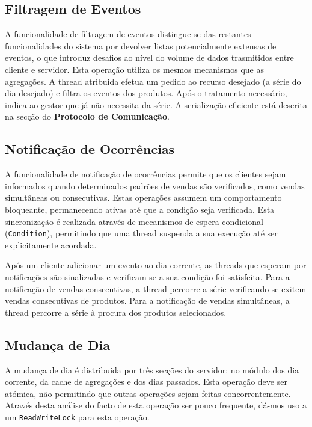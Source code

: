 \documentclass[11pt, a4paper, fleqn]{article}
\begin{document}
	
	\subsection{Filtragem de Eventos}
	
	A funcionalidade de filtragem de eventos distingue-se das restantes funcionalidades do sistema por devolver listas potencialmente extensas de eventos, o que introduz desafios ao nível do volume de dados trasmitidos entre cliente e servidor. Esta operação utiliza os mesmos mecanismos que as agregações. A thread atribuida efetua um pedido ao recurso desejado (a série do dia desejado) e filtra os eventos dos produtos. Após o tratamento necessário, indica ao gestor que já não necessita da série. A serialização eficiente está descrita na secção do \textbf{Protocolo de Comunicação}.
	
	
	\subsection{Notificação de Ocorrências}
	
	A funcionalidade de notificação de ocorrências permite que os clientes sejam informados quando determinados padrões de vendas são verificados, como vendas simultâneas ou consecutivas. Estas operações assumem um comportamento bloqueante, permanecendo ativas até que a condição seja verificada. Esta sincronização é realizada através de mecanismos de espera condicional (\texttt{Condition}), permitindo que uma thread suspenda a sua execução até ser explicitamente acordada.
	
	Após um cliente adicionar um evento ao dia corrente, as threads que esperam por notificações são sinalizadas e verificam se a sua condição foi satisfeita. Para a notificação de vendas consecutivas, a thread percorre a série verificando se exitem vendas consecutivas de produtos. Para a notificação de vendas simultâneas, a thread percorre a série à procura dos produtos selecionados.
	
	
	\subsection{Mudança de Dia}
	
	A mudança de dia é distribuida por três secções do servidor: no módulo dos dia corrente, da cache de agregações e dos dias passados. Esta operação deve ser atómica, não permitindo que outras operações sejam feitas concorrentemente. Através desta análise do facto de esta operação ser pouco frequente, dá-mos uso a um \texttt{ReadWriteLock} para esta operação.
	
\end{document}
